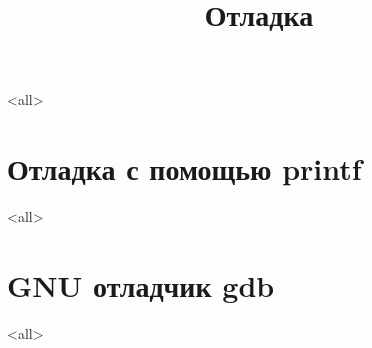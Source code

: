 

\title[Отладка]{Отладка}





\begin{frame}
	\frametitle{}
	\titlepage
	\vspace{-0.5cm}
	\begin{center}
	\end{center}
\end{frame}

\begin{frame}
	\tableofcontents
\end{frame}



\mode<all>{}

\section{Отладка с помощью printf}

\mode<all>{}

\section{GNU отладчик gdb}
\mode<all>{}


